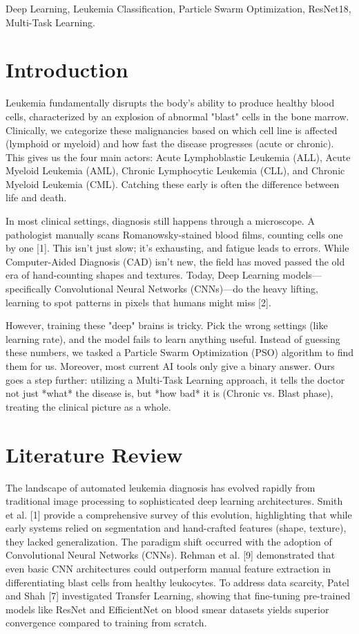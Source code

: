 \documentclass[conference]{IEEEtran}
\begin{document}
\begin{IEEEkeywords}
Deep Learning, Leukemia Classification, Particle Swarm Optimization, ResNet18, Multi-Task Learning.
\end{IEEEkeywords}

\section{Introduction}
Leukemia fundamentally disrupts the body's ability to produce healthy blood cells, characterized by an explosion of abnormal "blast" cells in the bone marrow. Clinically, we categorize these malignancies based on which cell line is affected (lymphoid or myeloid) and how fast the disease progresses (acute or chronic). This gives us the four main actors: Acute Lymphoblastic Leukemia (ALL), Acute Myeloid Leukemia (AML), Chronic Lymphocytic Leukemia (CLL), and Chronic Myeloid Leukemia (CML). Catching these early is often the difference between life and death.

In most clinical settings, diagnosis still happens through a microscope. A pathologist manually scans Romanowsky-stained blood films, counting cells one by one [1]. This isn't just slow; it's exhausting, and fatigue leads to errors. While Computer-Aided Diagnosis (CAD) isn't new, the field has moved passed the old era of hand-counting shapes and textures. Today, Deep Learning models—specifically Convolutional Neural Networks (CNNs)—do the heavy lifting, learning to spot patterns in pixels that humans might miss [2].

However, training these "deep" brains is tricky. Pick the wrong settings (like learning rate), and the model fails to learn anything useful. Instead of guessing these numbers, we tasked a Particle Swarm Optimization (PSO) algorithm to find them for us. Moreover, most current AI tools only give a binary answer. Ours goes a step further: utilizing a Multi-Task Learning approach, it tells the doctor not just *what* the disease is, but *how bad* it is (Chronic vs. Blast phase), treating the clinical picture as a whole.

\section{Literature Review}
The landscape of automated leukemia diagnosis has evolved rapidly from traditional image processing to sophisticated deep learning architectures. Smith et al. [1] provide a comprehensive survey of this evolution, highlighting that while early systems relied on segmentation and hand-crafted features (shape, texture), they lacked generalization. The paradigm shift occurred with the adoption of Convolutional Neural Networks (CNNs). Rehman et al. [9] demonstrated that even basic CNN architectures could outperform manual feature extraction in differentiating blast cells from healthy leukocytes. To address data scarcity, Patel and Shah [7] investigated Transfer Learning, showing that fine-tuning pre-trained models like ResNet and EfficientNet on blood smear datasets yields superior convergence compared to training from scratch.
\end{document}
